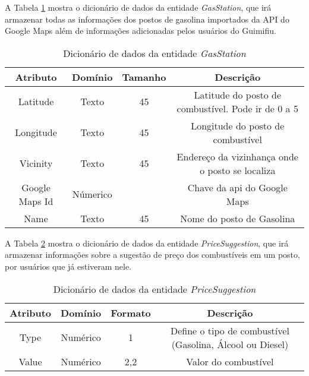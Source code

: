 A Tabela \ref{dic:gas_station} mostra o dicionário de dados da entidade \textit{GasStation}, que irá armazenar todas as informações dos postos de gasolina importados da API do Google Maps além de informações adicionadas pelos usuários do Guimifiu.
\begin{table}[H]
\centering
\caption{Dicionário de dados da entidade \textit{GasStation}}
\label{dic:gas_station}
\begin{tabular}{cccc}
\toprule
\textbf{Atributo} & \textbf{Domínio} & \textbf{Tamanho} & \textbf{Descrição} \\
\midrule
Latitude                        & Texto                          & 45                             & Latitude do posto de combustível. Pode ir de 0 a 5                 \\
Longitude                       & Texto                          & 45                             & Longitude do posto de combustível\\
Vicinity                        & Texto                          & 45                             & Endereço da vizinhança onde o posto se localiza \\
Google Maps Id                  & Númerico                       &                                & Chave da api do Google Maps      \\
Name                            & Texto                          & 45                             & Nome do posto de Gasolina\\
\bottomrule
\end{tabular}
\end{table}

A Tabela \ref{dic:pricesuggestion} mostra o dicionário de dados da entidade \textit{PriceSuggestion}, que irá armazenar informações sobre a sugestão de preço dos combustíveis em um posto, por usuários que já estiveram nele.
\begin{table}[H]
\centering
\caption{Dicionário de dados da entidade \textit{PriceSuggestion}}
\label{dic:pricesuggestion}
\begin{tabular}{cccc}
\toprule
\textbf{Atributo} & \textbf{Domínio} & \textbf{Formato} & \textbf{Descrição} \\
\midrule
Type                            & Numérico                       & 1                              & Define o tipo de combustível (Gasolina, Álcool ou Diesel)\\
Value                           & Numérico                       & 2,2                          & Valor do combustível\\
\bottomrule
\end{tabular}
\end{table}

